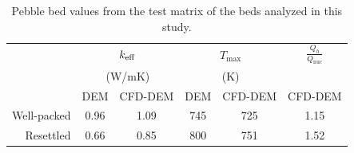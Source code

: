 \begin {table}[htp] %
\caption{Pebble bed values from the test matrix of the beds analyzed in this study.}
\label {tab:cfdem-keff} \centering %
\begin {tabular}{ rccccc }
\toprule %
			& 	\multicolumn{2}{c}{$k_\text{eff}$}	&   \multicolumn{2}{c}{$T_\text{max}$}	&	$\frac{Q_h}{Q_\text{nuc}}$		\\
			& 	\multicolumn{2}{c}{(W/mK)}			&	\multicolumn{2}{c}{(K)}				&									\\
			& 	DEM 		& 	CFD-DEM				&	DEM 		& 	CFD-DEM 			& 	CFD-DEM							\\\toprule
Well-packed	& 	0.96		& 	1.09				& 	745			& 	725					& 	1.15							\\
Resettled	& 	0.66		& 	0.85				& 	800			& 	751					& 	1.52							\\\bottomrule
\end{tabular}
\end{table}





\FloatBarrier

